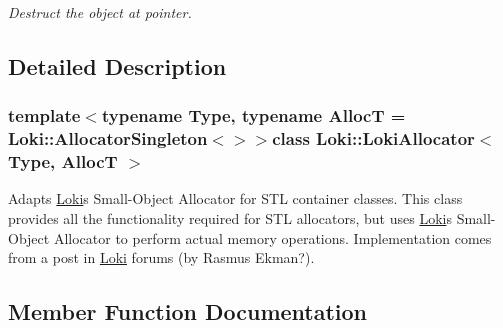 \begin{DoxyCompactItemize}
\begin{DoxyCompactList}\small\item\em Destruct the object at pointer. \end{DoxyCompactList}\end{DoxyCompactItemize}


\subsection{Detailed Description}
\subsubsection*{template$<$typename Type, typename Alloc\+T = Loki\+::\+Allocator\+Singleton$<$$>$$>$class Loki\+::\+Loki\+Allocator$<$ Type, Alloc\+T $>$}

Adapts \hyperlink{namespaceLoki}{Loki}\textquotesingle{}s Small-\/\+Object Allocator for S\+T\+L container classes. This class provides all the functionality required for S\+T\+L allocators, but uses \hyperlink{namespaceLoki}{Loki}\textquotesingle{}s Small-\/\+Object Allocator to perform actual memory operations. Implementation comes from a post in \hyperlink{namespaceLoki}{Loki} forums (by Rasmus Ekman?). 

\subsection{Member Function Documentation}
\hypertarget{classLoki_1_1LokiAllocator_a856c0d1e1f32b786421c02d468020758}{}
